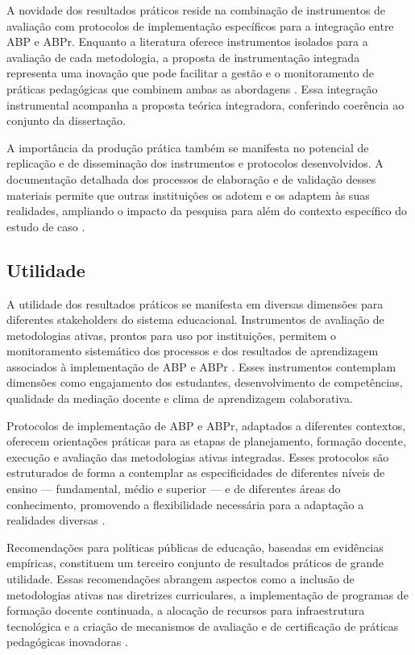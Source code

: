 A novidade dos resultados práticos reside na combinação de instrumentos de avaliação com protocolos de implementação específicos para a integração entre ABP e ABPr. Enquanto a literatura oferece instrumentos isolados para a avaliação de cada metodologia, a proposta de instrumentação integrada representa uma inovação que pode facilitar a gestão e o monitoramento de práticas pedagógicas que combinem ambas as abordagens \cite{TEODORO2024}. Essa integração instrumental acompanha a proposta teórica integradora, conferindo coerência ao conjunto da dissertação.

A importância da produção prática também se manifesta no potencial de replicação e de disseminação dos instrumentos e protocolos desenvolvidos. A documentação detalhada dos processos de elaboração e de validação desses materiais permite que outras instituições os adotem e os adaptem às suas realidades, ampliando o impacto da pesquisa para além do contexto específico do estudo de caso \cite{BARRON1998}.

\subsection{Utilidade}
\label{subsec:jpr_utilidade}

A utilidade dos resultados práticos se manifesta em diversas dimensões para diferentes stakeholders do sistema educacional. Instrumentos de avaliação de metodologias ativas, prontos para uso por instituições, permitem o monitoramento sistemático dos processos e dos resultados de aprendizagem associados à implementação de ABP e ABPr \cite{BLACK1998}. Esses instrumentos contemplam dimensões como engajamento dos estudantes, desenvolvimento de competências, qualidade da mediação docente e clima de aprendizagem colaborativa.

Protocolos de implementação de ABP e ABPr, adaptados a diferentes contextos, oferecem orientações práticas para as etapas de planejamento, formação docente, execução e avaliação das metodologias ativas integradas. Esses protocolos são estruturados de forma a contemplar as especificidades de diferentes níveis de ensino — fundamental, médio e superior — e de diferentes áreas do conhecimento, promovendo a flexibilidade necessária para a adaptação a realidades diversas \cite{SANTOS2019}.

Recomendações para políticas públicas de educação, baseadas em evidências empíricas, constituem um terceiro conjunto de resultados práticos de grande utilidade. Essas recomendações abrangem aspectos como a inclusão de metodologias ativas nas diretrizes curriculares, a implementação de programas de formação docente continuada, a alocação de recursos para infraestrutura tecnológica e a criação de mecanismos de avaliação e de certificação de práticas pedagógicas inovadoras \cite{MACHADO2025}.

